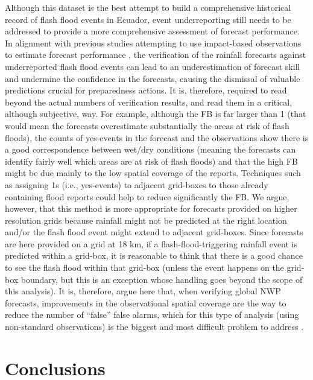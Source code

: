 \documentclass[techmemo]{ecmwfrep}%
\begin{document}
Although this dataset is the best attempt to build a comprehensive historical record of flash flood events in Ecuador, event underreporting still needs to be addressed to provide a more comprehensive assessment of forecast performance. In alignment with previous studies attempting to use impact-based observations to estimate forecast performance \citep{Hitchens2013, Mitheu2023, Robbins2018}, the verification of the rainfall forecasts against underreported flash flood events can lead to an underestimation of forecast skill and undermine the confidence in the forecasts, causing the dismissal of valuable predictions crucial for preparedness actions. It is, therefore, required to read beyond the actual numbers of verification results, and read them in a critical, although subjective, way. For example, although the FB is far larger than 1 (that would mean the forecasts overestimate substantially the areas at risk of flash floods), the counts of yes-events in the forecast and the observations show there is a good correspondence between wet/dry conditions (meaning the forecasts can identify fairly well which areas are at risk of flash floods) and that the high FB might be due mainly to the low spatial coverage of the reports. Techniques such as assigning 1s (i.e., yes-events) to adjacent grid-boxes to those already containing flood reports could help to reduce significantly the FB. We argue, however, that this method is more appropriate for forecasts provided on higher resolution grids because rainfall might not be predicted at the right location and/or the flash flood event might extend to adjacent grid-boxes. Since forecasts are here provided on a grid at 18 km, if a flash-flood-triggering rainfall event is predicted within a grid-box, it is reasonable to think that there is a good chance to see the flash flood within that grid-box (unless the event happens on the grid-box boundary, but this is an exception whose handling goes beyond the scope of this analysis). It  is, therefore, argue here that, when verifying global NWP forecasts, improvements in the observational spatial coverage are the way to reduce the number of “false” false alarms, which for this type of analysis (using non-standard observations) is the biggest and most difficult problem to address \citep{Marsigli2021}.


\section{Conclusions}
\label{sec:Conclusions}
\end{document}
